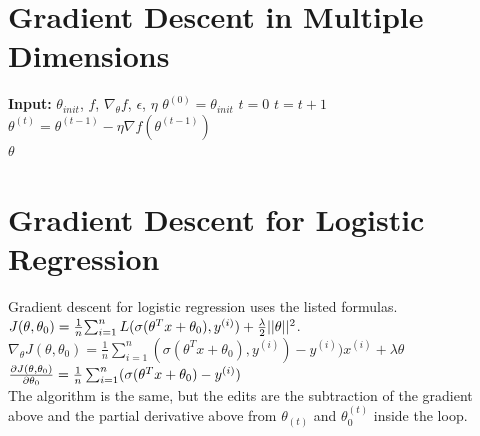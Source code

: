 \documentclass{article}
\begin{document}
    \section{Gradient Descent in Multiple Dimensions}
    \begin{algorithm}
    \begin{algorithmic}[]
        \State \textbf{Input:} $\theta_{init}$, $f$, $\nabla_\theta{f}$, $\epsilon$, $\eta$
        \State $\theta^{(0)} = \theta_{init}$
        \State $t=0$
            \State $t = t+1$ 
            \State $\theta^{(t)}=\theta^{(t-1)}-\eta{\nabla{f(\theta^{(t-1)})}}$
        \EndWhile \\
        \Return $\theta$
    \end{algorithmic}
    \end{algorithm}

    \section{Gradient Descent for Logistic Regression}
    Gradient descent for logistic regression uses the listed formulas. \\
    $J(\theta, \theta_0) = {1\over{n}}{\sum_{i=1}^n{L(\sigma(\theta^Tx+\theta_0),y^{(i)})}+\frac{\lambda}{2}{||\theta||^2}}$. \\
    $\nabla_\theta{J(\theta, \theta_0)}=\frac{1}{n}\sum_{i=1}^{n}{(\sigma(\theta^Tx+\theta_0),y^{(i)})-y^{(i)})x^{(i)}}+\lambda\theta$\\
    $\frac{\partial J(\theta, \theta_0)}{\partial \theta_0}={1\over{n}}\sum^n_{i=1}({\sigma(\theta^Tx+\theta_0)}-y^{(i)})$ \\ 
    The algorithm is the same, but the edits are the subtraction of the gradient above and the partial derivative above from $\theta_{(t)}$ and $\theta_0^{(t)}$ inside the loop.
       
    
\end{document}
